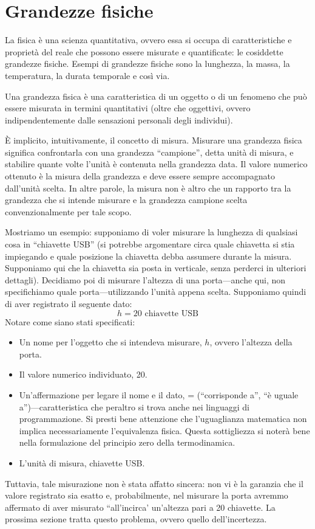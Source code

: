 \section{Grandezze fisiche}
La fisica è una scienza quantitativa, ovvero essa si occupa di caratteristiche
e proprietà del reale che possono essere misurate e quantificate: le cosiddette
grandezze fisiche. Esempi di grandezze fisiche sono la lunghezza, la massa, la
temperatura, la durata temporale e così via.

\begin{tcolorbox}[colback = yellow!30, colframe = yellow!30!black, title = {Grandezza fisica}]
Una grandezza fisica è una caratteristica di un oggetto o di un fenomeno che può
essere misurata in termini quantitativi (oltre che oggettivi, ovvero indipendentemente
dalle sensazioni personali degli individui).
\end{tcolorbox}

\noindent È implicito, intuitivamente, il concetto di misura. Misurare una grandezza
fisica significa confrontarla con una grandezza ``campione'', detta unità
di misura, e stabilire quante volte l'unità è contenuta nella
grandezza data. Il valore numerico ottenuto è la misura della grandezza e deve
essere sempre accompagnato dall'unità scelta.
In altre parole, la misura non è altro che un rapporto tra la
grandezza che si intende misurare e la grandezza campione scelta convenzionalmente
per tale scopo.

Mostriamo un esempio: supponiamo di voler misurare la lunghezza di qualsiasi cosa
in ``chiavette USB'' (si potrebbe argomentare circa quale chiavetta si stia
impiegando e quale posizione la chiavetta debba assumere durante la misura.
Supponiamo qui che la chiavetta sia posta in verticale, senza perderci in ulteriori
dettagli). Decidiamo poi di misurare l'altezza di una porta—anche qui, non
specifichiamo quale porta—utilizzando l'unità appena scelta. Supponiamo quindi
di aver registrato il seguente dato:
\[ h = 20 \text{ chiavette USB} \]
Notare come siano stati specificati:
\begin{itemize}
    \item Un nome per l'oggetto che si intendeva misurare, $h$, ovvero l'altezza
    della porta.
    \item Il valore numerico individuato, 20.
    \item Un'affermazione per legare il nome e il dato, = (``corrisponde a'', ``è
    uguale a'')—caratteristica che peraltro si trova anche nei linguaggi di
    programmazione. Si presti bene attenzione che l'uguaglianza matematica
    non implica necessariamente l'equivalenza fisica. Questa sottigliezza si
    noterà bene nella formulazione del principio zero della termodinamica.
    \item L'unità di misura, chiavette USB.
\end{itemize}
Tuttavia, tale misurazione non è stata affatto sincera: non vi è la
garanzia che il valore registrato sia esatto e, probabilmente, nel
misurare la porta avremmo affermato di aver misurato ``all'incirca'
un'altezza pari a 20 chiavette. La prossima sezione
tratta questo problema, ovvero quello dell'incertezza.


